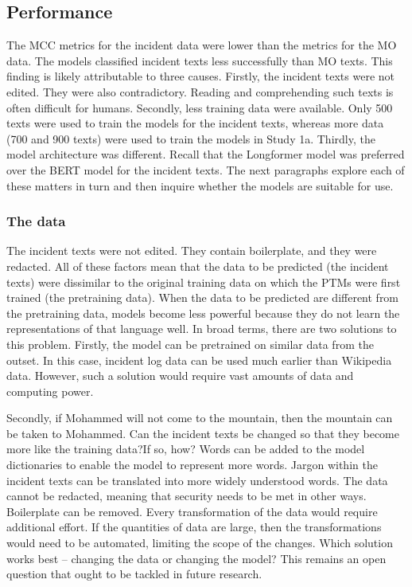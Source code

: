 \subsection{Performance} The MCC metrics for the incident data were lower than the metrics for the MO data. The models classified incident texts less successfully than MO texts. This finding is likely attributable to three causes. Firstly, the incident texts were not edited. They were also contradictory. Reading and comprehending such texts is often difficult for humans. Secondly, less training data were available. Only 500 texts were used to train the models for the incident texts, whereas more data (700 and 900 texts) were used to train the models in Study 1a. Thirdly, the model architecture was different. Recall that the Longformer model was preferred over the BERT model for the incident texts. The next paragraphs explore each of these matters in turn and then inquire whether the models are suitable for use.

\subsubsection{The data} The incident texts were not edited. They contain boilerplate, and they were redacted. All of these factors mean that the data to be predicted (the incident texts) were dissimilar to the original training data on which the PTMs were first trained (the pretraining data). When the data to be predicted are different from the pretraining data, models become less powerful because they do not learn the representations of that language well. In broad terms, there are two solutions to this problem. Firstly, the model can be pretrained on similar data from the outset. In this case, incident log data can be used much earlier than Wikipedia data. However, such a solution would require vast amounts of data and computing power.

Secondly, if Mohammed will not come to the mountain, then the mountain can be taken to Mohammed. Can the incident texts be changed so that they become more like the training data?If so, how? Words can be added to the model dictionaries to enable the model to represent more words. Jargon within the incident texts can be translated into more widely understood words. The data cannot be redacted, meaning that security needs to be met in other ways. Boilerplate can be removed. Every transformation of the data would require additional effort. If the quantities of data are large, then the transformations would need to be automated, limiting the scope of the changes. Which solution works best – changing the data or changing the model? This remains an open question that ought to be tackled in future research. 

